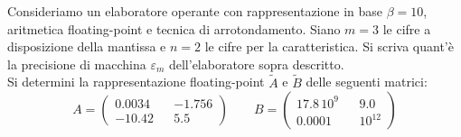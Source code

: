 Consideriamo un elaboratore operante con rappresentazione in base 
$\beta=10$, aritmetica floating-point e tecnica di 
arrotondamento. Siano $m=3$ le cifre a disposizione della 
mantissa e $n=2$ le cifre per la caratteristica. Si scriva 
quant'\`{e} la precisione di macchina $\varepsilon_m$ 
dell'elaboratore sopra descritto.\\

\noindent Si determini la rappresentazione floating-point 
$\widetilde{A}$ e $\widetilde{B}$ delle seguenti matrici:
\[
A=\left(
\begin{array}{ccc}
0.0034 && -1.756 \\
-10.42 && 5.5
\end{array}
\right ) \quad \quad B=\left(
\begin{array}{ccc}
17.8\, 10^{9} & & 9.0 \\
0.0001 &  & 10^{12}
\end{array}
\right )
\]

